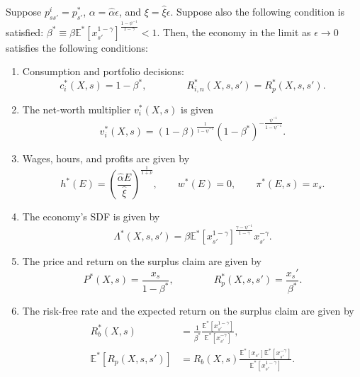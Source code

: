 \begin{proposition}\label{oa_iid} Suppose $p_{ss'}^i = p_{s'}^*$, $\alpha = \hat{\alpha} \epsilon$, and $ \xi = \hat{\xi} \epsilon$. Suppose also the following condition  is satisfied: $\beta^* \equiv \beta \mathbb{E}^*[x_{s'}^{1-\gamma}]^{\frac{1-\psi^{-1}}{1-\gamma}} < 1$. Then, the economy in the limit as $\epsilon \rightarrow 0$ satisfies the following conditions:
\begin{enumerate}
    \item Consumption and portfolio decisions:
    \begin{equation}
        c_i^*(X,s) = 1-\beta^*, \qquad \qquad R_{i,n}^*(X,s,s') = R^*_p(X,s,s').
    \end{equation}
    
    
    \item The net-worth multiplier $v_i^*(X,s)$ is given 
    \begin{equation}
        v_i^*(X,s) = (1-\beta)^{\frac{1}{1-\psi^{-1}}} (1-\beta^*)^{-\frac{\psi^{-1}}{1-\psi^{-1}}}.
    \end{equation}
    
    \item Wages, hours, and profits are given by
\begin{equation}
    h^*(E) = \left( \frac{\hat{\alpha} E}{\hat{\xi}} \right)^{\frac{1}{1+\nu}}, \qquad  
    w^*(E) = 0, \qquad  
    \pi^*(E,s) = x_s.
\end{equation}
    
    \item The economy's SDF is given by
    \begin{equation}
        \Lambda^*(X,s,s') = \beta \mathbb{E}^*[x_{s'}^{1-\gamma}]^{\frac{\gamma-\psi^{-1}}{1-\gamma}} x_{s'}^{-\gamma}.
    \end{equation}
    
    \item The price and return on the surplus claim are given by
    \begin{equation}
        P^*(X,s) = \frac{x_s}{1-\beta^*}, \qquad \qquad 
        R^*_p(X,s,s') = \frac{x_s'}{\beta^*}.
    \end{equation}
    
    \item The risk-free rate and the expected return on the surplus claim are given by
    \begin{align}
        R_b^*(X,s) &= \frac{1}{\beta^*} \frac{\mathbb{E}^*[ x_{s'}^{1-\gamma} ]}{\mathbb{E}^*[x_{s'}^{-\gamma}]} ,  \\
        \mathbb{E}^*[R_p(X,s,s')] &= 
         R_b(X,s) \frac{\mathbb{E}^*[x_{s'}] \mathbb{E}^*[x_{s'}^{-\gamma}]}{\mathbb{E}^*[x_{s'}^{1-\gamma}] }.
    \end{align}
    

\end{enumerate}
\end{proposition}
